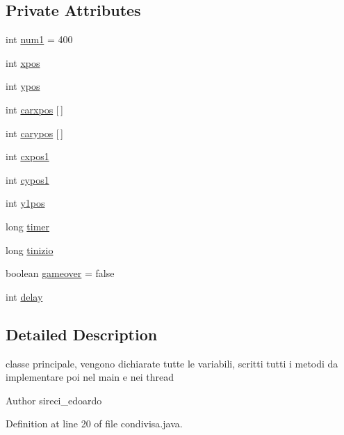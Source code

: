 \subsection*{Private Attributes}
\begin{DoxyCompactItemize}
\item 
int \hyperlink{classcargame_1_1condivisa_ad023fa22fc14680886cc9bb170cbc099}{num1} = 400
\item 
int \hyperlink{classcargame_1_1condivisa_a4c8fb3f1c1ae597ee856290390ebc274}{xpos}
\item 
int \hyperlink{classcargame_1_1condivisa_a4db09a4236b6f591c377857b932eb41a}{ypos}
\item 
int \hyperlink{classcargame_1_1condivisa_aa67ca8c6cac33ea9d090d5826bcd6c68}{carxpos} \mbox{[}$\,$\mbox{]}
\item 
int \hyperlink{classcargame_1_1condivisa_a299cc3db0f1473b5cff99e2faf23ec3b}{carypos} \mbox{[}$\,$\mbox{]}
\item 
int \hyperlink{classcargame_1_1condivisa_ae2dabfc28e9264616512058bf59b8d7d}{cxpos1}
\item 
int \hyperlink{classcargame_1_1condivisa_a4493a5b3d22e1fa918e1aaaa5a858bdf}{cypos1}
\item 
int \hyperlink{classcargame_1_1condivisa_a48fa33e93e6fb92e83f1267b8c9b3b70}{y1pos}
\item 
long \hyperlink{classcargame_1_1condivisa_a464494475fd50fe632c9e8bb3ffc63b3}{timer}
\item 
long \hyperlink{classcargame_1_1condivisa_affe5d112c1c695c8d9225a4f5a98eede}{tinizio}
\item 
boolean \hyperlink{classcargame_1_1condivisa_a5dabf0834c87a8496bdb1a69835a00f0}{gameover} = false
\item 
int \hyperlink{classcargame_1_1condivisa_a6f1be1f780ff54ec75b41451cd4d90bd}{delay}
\end{DoxyCompactItemize}


\subsection{Detailed Description}
classe principale, vengono dichiarate tutte le variabili, scritti tutti i metodi da implementare poi nel main e nei thread 

\begin{DoxyAuthor}{Author}
sireci\+\_\+edoardo 
\end{DoxyAuthor}


Definition at line 20 of file condivisa.\+java.



